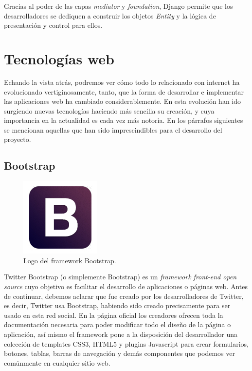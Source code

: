 Gracias al poder de las capas \textit{mediator} y \textit{foundation}, Django permite que los desarrolladores se dediquen a construir los objetos \textit{Entity} y la l\'ogica de presentaci\'on y control para ellos.\\

\section{Tecnolog\'ias web}\label{SEC:Seccion3}

Echando la vista atr\'as, podremos ver c\'omo todo lo relacionado con internet ha evolucionado vertiginosamente, tanto, que la forma de desarrollar e implementar las aplicaciones web ha cambiado considerablemente. En esta evoluci\'on han ido surgiendo nuevas tecnolog\'ias haciendo m\'as sencilla su creaci\'on, y cuya importancia en la actualidad es cada vez m\'as notoria. En los p\'arrafos siguientes se mencionan aquellas que han sido imprescindibles para el desarrollo del proyecto.\\

\subsection{Bootstrap}

\begin{figure}[htbp]

    \centering
    	\includegraphics[scale=0.5]{./Figuras/bootstraplogo.jpg}
    \caption{Logo del framework Bootstrap. }
    \label{fig:bootstrap}  
    
\end{figure}

Twitter Bootstrap (o simplemente Bootstrap) es un \textit{framework front-end open source} cuyo objetivo es facilitar el desarrollo de aplicaciones o p\'aginas web. Antes de continuar, debemos aclarar que fue creado por los desarrolladores de Twitter, es decir, Twitter usa Bootstrap, habiendo sido creado precisamente para ser usado en esta red social. En la p\'agina oficial los creadores ofrecen toda la documentaci\'on necesaria para poder modificar todo el dise\~no de la p\'agina o aplicaci\'on, as\'i mismo el framework pone a la disposici\'on del desarrollador una colecci\'on de templates CSS3, HTML5 y plugins Javascript para crear formularios, botones, tablas, barras de navegaci\'on y dem\'as componentes que podemos ver com\'unmente en cualquier sitio web.\\

